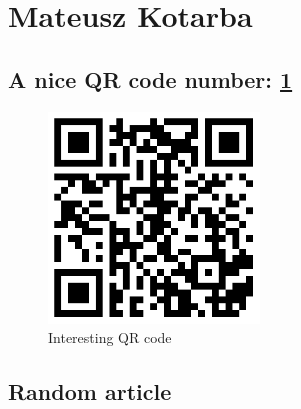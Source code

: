 \newpage
\section{Mateusz Kotarba}

\subsection{A nice QR code number: \ref{fig:QR code}}

\begin{figure}[h] 
    \centering
    \includegraphics[width=0.5\textwidth]{pictures/Rickrolling_QR_code.png} 
    \caption{Interesting QR code}
    \label{fig:QR code}
\end{figure}

\subsection{Random article}

